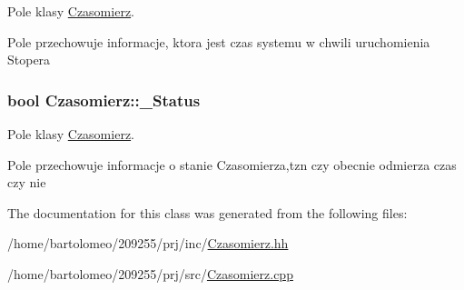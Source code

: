 Pole klasy \hyperlink{class_czasomierz}{Czasomierz}. 

Pole przechowuje informacje, ktora jest czas systemu w chwili uruchomienia Stopera \hypertarget{class_czasomierz_a5eb9aa3fd9f0fb8af343f2865d490e64}{
\subsubsection[{\-\_\-\-Status}]{\setlength{\rightskip}{0pt plus 5cm}bool Czasomierz\-::\-\_\-\-Status\hspace{0.3cm}{\ttfamily [private]}}}\label{class_czasomierz_a5eb9aa3fd9f0fb8af343f2865d490e64}


Pole klasy \hyperlink{class_czasomierz}{Czasomierz}. 

Pole przechowuje informacje o stanie Czasomierza,tzn czy obecnie odmierza czas czy nie 

The documentation for this class was generated from the following files\-:\begin{DoxyCompactItemize}
\item 
/home/bartolomeo/209255/prj/inc/\hyperlink{_czasomierz_8hh}{Czasomierz.\-hh}\item 
/home/bartolomeo/209255/prj/src/\hyperlink{_czasomierz_8cpp}{Czasomierz.\-cpp}\end{DoxyCompactItemize}
